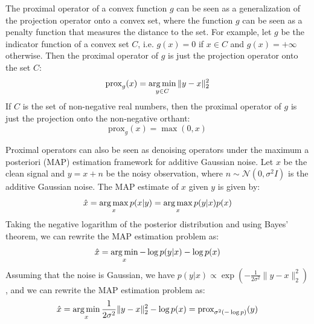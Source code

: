The proximal operator of a convex function $g$ can be seen as a generalization of the projection operator onto a convex set, where the function $g$ can be seen as a penalty function that measures the distance to the set.
For example, let $g$ be the indicator function of a convex set $C$, i.e. $g(x) = 0$ if $x \in C$ and $g(x) = +\infty$ otherwise.
Then the proximal operator of $g$ is just the projection operator onto the set $C$:
\begin{equation}
    \text{prox}_g(x) = \mathop{\mathrm{arg\,min}}_{y \in C} \|y - x\|_2^2
\end{equation}
If $C$ is the set of non-negative real numbers, then the proximal operator of $g$ is just the projection onto the non-negative orthant:
\begin{equation}
    \text{prox}_g(x) = \max(0, x)
\end{equation}

Proximal operators can also be seen as denoising operators under the maximum a posteriori (MAP) estimation framework for additive Gaussian noise. Let $x$ be the clean signal and $y = x + n$ be the noisy observation, where $n \sim \mathcal{N}(0, \sigma^2 I)$ is the additive Gaussian noise. The MAP estimate of $x$ given $y$ is given by:
\begin{equation}
    \hat{x} = \mathop{\mathrm{arg\,max}}_x p(x|y) = \mathop{\mathrm{arg\,max}}_x p(y|x) p(x)
\end{equation}
Taking the negative logarithm of the posterior distribution and using Bayes' theorem, we can rewrite the MAP estimation problem as:
\begin{equation}
    \hat{x} = \mathop{\mathrm{arg\,min}}_x -\log p(y|x) -\log p(x)
\end{equation}
Assuming that the noise is Gaussian, we have $p(y|x) \propto \exp\left(-\frac{1}{2\sigma^2} \|y - x\|_2^2\right)$, and we can rewrite the MAP estimation problem as:
\begin{equation}
    \hat{x} = \mathop{\mathrm{arg\,min}}_x \frac{1}{2\sigma^2} \|y - x\|_2^2 - \log p(x) = \text{prox}_{\sigma^2 (-\log p)}(y)
\end{equation}

